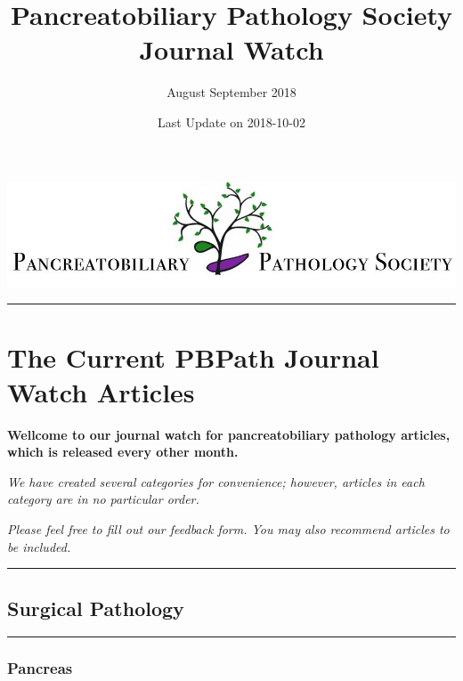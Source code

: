 \documentclass[]{article}
\title{Pancreatobiliary Pathology Society Journal Watch}
\subtitle{August September 2018}
\author{}
\date{Last Update on 2018-10-02}
\begin{document}
\maketitle

{
\setcounter{tocdepth}{5}
\tableofcontents
}
\href{http://pbpath.org/}{\includegraphics{figures/PBP_header_logo.jpg}}

\begin{center}\rule{0.5\linewidth}{\linethickness}\end{center}

\hypertarget{the-current-pbpath-journal-watch-articles}{%
\section{The Current PBPath Journal Watch
Articles}\label{the-current-pbpath-journal-watch-articles}}

\textbf{Wellcome to our journal watch for pancreatobiliary pathology
articles, which is released every other month.}

\emph{We have created several categories for convenience; however,
articles in each category are in no particular order.}

\emph{Please feel free to fill out our feedback form. You may also
recommend articles to be included.}

\pagebreak

\begin{center}\rule{0.5\linewidth}{\linethickness}\end{center}

\hypertarget{surgical-pathology}{%
\subsection{Surgical Pathology}\label{surgical-pathology}}

\begin{center}\rule{0.5\linewidth}{\linethickness}\end{center}

\hypertarget{pancreas}{%
\subsubsection{Pancreas}\label{pancreas}}
\end{document}
